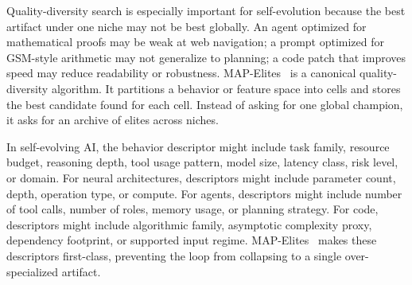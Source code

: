 Quality-diversity search is especially important for self-evolution because the best artifact under one niche may not be best globally.  An agent optimized for mathematical proofs may be weak at web navigation; a prompt optimized for GSM-style arithmetic may not generalize to planning; a code patch that improves speed may reduce readability or robustness.  MAP-Elites~\cite{mouret2015illuminating} is a canonical quality-diversity algorithm.  It partitions a behavior or feature space into cells and stores the best candidate found for each cell.  Instead of asking for one global champion, it asks for an archive of elites across niches.

In self-evolving AI, the behavior descriptor might include task family, resource budget, reasoning depth, tool usage pattern, model size, latency class, risk level, or domain.  For neural architectures, descriptors might include parameter count, depth, operation type, or compute.  For agents, descriptors might include number of tool calls, number of roles, memory usage, or planning strategy.  For code, descriptors might include algorithmic family, asymptotic complexity proxy, dependency footprint, or supported input regime.  MAP-Elites~\cite{mouret2015illuminating} makes these descriptors first-class, preventing the loop from collapsing to a single over-specialized artifact.

